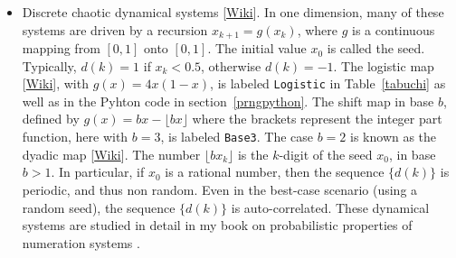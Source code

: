 \documentclass[oneside,10pt]{book}
\begin{document}
\begin{itemize}
\item Discrete chaotic \textcolor{index}{dynamical systems} [\href{https://en.wikipedia.org/wiki/Dynamical_system}{Wiki}]. 
 In one dimension, many of these systems are driven by a recursion $x_{k+1}=g(x_k)$, where $g$ is a continuous mapping from
$[0,1]$ onto $[0,1]$. The initial value $x_0$ is called the seed. Typically, $d(k)=1$ if $x_k<0.5$, otherwise $d(k)=-1$. The \textcolor{index}{logistic map} [\href{https://en.wikipedia.org/wiki/Logistic_map}{Wiki}], with $g(x)=4x(1-x)$, is labeled \texttt{Logistic} in Table~\ref{tabuchi} as well as in the Pyhton code
 in section~\ref{prngpython}. The \textcolor{index}{shift map} in base $b$, defined by $g(x)=bx-\lfloor bx\rfloor$ where the brackets represent the integer part function, here with $b=3$, is labeled  
\texttt{Base3}. The case $b=2$ is known as the 
 \textcolor{index}{dyadic map} [\href{https://en.wikipedia.org/wiki/Dyadic_transformation}{Wiki}]. 
The number $\lfloor bx_k\rfloor$
  is the $k$-digit of the seed $x_0$, in base $b>1$. In particular, if $x_0$ is a rational number, then the sequence
$\{d(k)\}$ is periodic, and thus non random. Even in the best-case scenario (using a random seed), the sequence $\{d(k)\}$ is auto-correlated. These dynamical systems are studied in detail in my book on probabilistic properties of numeration systems \cite{vgdyn}.


\end{itemize}
\end{document}

